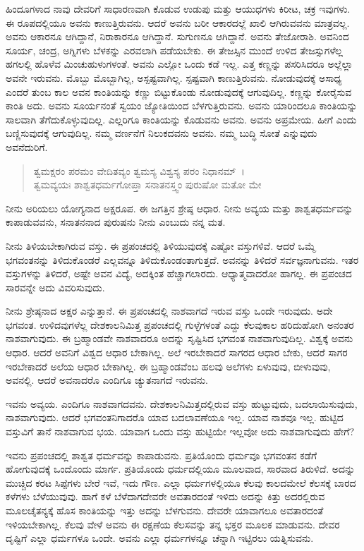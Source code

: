 ಹಿಂದೂಗಳಾದ ನಾವು ದೇವರಿಗೆ ಸಾಧಾರಣವಾಗಿ ಕೊಡುವ ಉಡುಪು ಮತ್ತು ಆಯುಧಗಳು ಕಿರೀಟ, ಚಕ್ರ ಇವುಗಳು. ಈ ರೂಪದಲ್ಲಿಯೂ ಅವನು ಕಾಣುತ್ತಿರುವನು. ಆದರೆ ಅವನು ಬರೀ ಆಕಾರದಲ್ಲೆ ಖಾಲಿ ಆಗಿರುವವನು ಮಾತ್ರವಲ್ಲ. ಅವನು ಆಕಾರನೂ ಆಗಿದ್ದಾನೆ, ನಿರಾಕಾರನೂ ಆಗಿದ್ದಾನೆ. ಸುಗುಣನೂ ಆಗಿದ್ದಾನೆ. ಅವನು ತೇಜೋರಾಶಿ. ಅವನಿಂದ ಸೂರ್ಯ, ಚಂದ್ರ, ಅಗ್ನಿಗಳು ಬೆಳಕನ್ನು ಎರವಲಾಗಿ ಪಡೆಯಬೇಕು. ಈ ತೇಜಸ್ಸಿನ ಮುಂದೆ ಉಳಿದ ತೇಜಸ್ಸುಗಳೆಲ್ಲ ಹಗಲಲ್ಲಿ ಹೊಳೆವ ಮಿಂಚುಹುಳುಗಳಂತೆ. ಅವನು ಎಲ್ಲೋ ಒಂದು ಕಡೆ ಇಲ್ಲ. ಎತ್ತ ಕಣ್ಣನ್ನು ಪಸರಿಸಿದರೂ ಅಲ್ಲೆಲ್ಲಾ ಅವನೇ ಇರುವನು. ಮೊಬ್ಬು ಮೊಬ್ಬಾಗಿಲ್ಲ, ಅಸ್ಪಷ್ಟವಾಗಿಲ್ಲ. ಸ್ಪಷ್ಟವಾಗಿ ಕಾಣುತ್ತಿರುವನು. ನೋಡುವುದಕ್ಕೆ ಅಸಾಧ್ಯ ಎಂದರೆ ತುಂಬ ಕಾಲ ಅವನ ಕಾಂತಿಯನ್ನು ಕಣ್ಣು ಬಿಟ್ಟುಕೊಂಡು ನೋಡುವುದಕ್ಕೆ ಆಗುವುದಿಲ್ಲ. ಕಣ್ಣನ್ನು ಕೋರೈಸುವ ಕಾಂತಿ ಅದು. ಅವನು ಸೂರ್ಯನಂತೆ ಸ್ವಯಂ ಜ್ಯೋತಿಯಿಂದ ಬೆಳಗುತ್ತಿರುವನು. ಅವನು ಯಾರಿಂದಲೂ ಕಾಂತಿಯನ್ನು ಸಾಲವಾಗಿ ತೆಗೆದುಕೊಳ್ಳುವುದಿಲ್ಲ. ಎಲ್ಲರಿಗೂ ಕಾಂತಿಯನ್ನು ಕೊಡುವನು ಅವನು. ಅವನು ಅಪ್ರಮೇಯ. ಹೀಗೆ ಎಂದು ಬಣ್ಣಿಸುವುದಕ್ಕೆ ಆಗುವುದಿಲ್ಲ. ನಮ್ಮ ವರ್ಣನೆಗೆ ನಿಲುಕದವನು ಅವನು. ನಮ್ಮ ಬುದ್ಧಿ ಸೋತೆ ಎನ್ನುವುದು ಅವನೆದುರಿಗೆ.

\begin{verse}
ತ್ವಮಕ್ಷರಂ ಪರಮಂ ವೇದಿತವ್ಯಂ ತ್ವಮಸ್ಯ ವಿಶ್ವಸ್ಯ ಪರಂ ನಿಧಾನಮ್~।\\ತ್ವಮವ್ಯಯಃ ಶಾಶ್ವತಧರ್ಮಗೋಪ್ತಾ ಸನಾತನಸ್ತ್ವಂ ಪುರುಷೋ ಮತೋ ಮೇ 
\end{verse}

{\small ನೀನು ಅರಿಯಲು ಯೋಗ್ಯನಾದ ಅಕ್ಷರೂಪ. ಈ ಜಗತ್ತಿನ ಶ್ರೇಷ್ಠ ಆಧಾರ. ನೀನು ಅವ್ಯಯ ಮತ್ತು ಶಾಶ್ವತಧರ್ಮವನ್ನು ಕಾಪಾಡುವವನು, ಸನಾತನನಾದ ಪುರುಷನು ನೀನು ಎಂಬುದು ನನ್ನ ಮತ.}

ನೀನು ತಿಳಿಯಬೇಕಾಗಿರುವ ವಸ್ತು. ಈ ಪ್ರಪಂಚದಲ್ಲಿ ತಿಳಿಯುವುದಕ್ಕೆ ಎಷ್ಟೋ ವಸ್ತುಗಳಿವೆ. ಆದರೆ ಒಮ್ಮೆ ಭಗವಂತನನ್ನು ತಿಳಿದುಕೊಂಡರೆ ಎಲ್ಲವನ್ನೂ ತಿಳಿದುಕೊಂಡಂತಾಗುತ್ತದೆ. ಅವನನ್ನು ತಿಳಿದರೆ ಸರ್ವಜ್ಞನಾಗುವನು. ಇತರ ವಸ್ತುಗಳನ್ನು ತಿಳಿದರೆ, ಅಷ್ಟೇ ಅವನ ವಿದ್ಯೆ, ಅದಕ್ಕಿಂತ ಹೆಚ್ಚಾಗಲಾರದು. ಆಧ್ಯಾತ್ಮವಾದರೋ ಹಾಗಲ್ಲ. ಈ ಪ್ರಪಂಚದ ಸಾರವನ್ನೇ ಅದು ವಿವರಿಸುವುದು.

ನೀನು ಶ್ರೇಷ್ಠನಾದ ಅಕ್ಷರ ಎನ್ನುತ್ತಾನೆ. ಈ ಪ್ರಪಂಚದಲ್ಲಿ ನಾಶವಾಗದೆ ಇರುವ ವಸ್ತು ಒಂದೇ ಇರುವುದು. ಅದೇ ಭಗವಂತ. ಉಳಿದವುಗಳೆಲ್ಲ ದೇಶಕಾಲನಿಮಿತ್ತ ಪ್ರಪಂಚದಲ್ಲಿ ಗುಳ್ಳೆಗಳಂತೆ ಎದ್ದು ಕೆಲವುಕಾಲ ಹರಿದುಹೋಗಿ ಅನಂತರ ನಾಶವಾಗುವುದು. ಈ ಬ್ರಹ್ಮಾಂಡವೇ ನಾಶವಾದರೂ ಅದನ್ನು ಸೃಷ್ಟಿಸಿದ ಭಗವಂತ ನಾಶವಾಗುವುದಿಲ್ಲ. ವಿಶ್ವಕ್ಕೆ ಅವನು ಆಧಾರ. ಆದರೆ ಅವನಿಗೆ ವಿಶ್ವದ ಆಧಾರ ಬೇಕಾಗಿಲ್ಲ. ಅಲೆ ಇರಬೇಕಾದರೆ ಸಾಗರದ ಆಧಾರ ಬೇಕು, ಆದರೆ ಸಾಗರ ಇರಬೇಕಾದರೆ ಅಲೆಯ ಆಧಾರ ಬೇಕಾಗಿಲ್ಲ. ಈ ಬ್ರಹ್ಮಾಂಡವೆಂಬ ಹಲವು ಅಲೆಗಳು ಏಳುವುವು, ಬೀಳುವುವು, ಅವನಲ್ಲಿ. ಆದರೆ ಅವನಾದರೊ ಎಂದಿಗೂ ಚ್ಯುತನಾಗದೆ ಇರುವನು. 

ಇವನು ಅವ್ಯಯ. ಎಂದಿಗೂ ನಾಶವಾಗದವನು. ದೇಶಕಾಲನಿಮಿತ್ತದಲ್ಲಿರುವ ವಸ್ತು ಹುಟ್ಟುವುದು, ಬದಲಾಯಿಸುವುದು, ನಾಶವಾಗುವುದು. ಆದರೆ ಭಗವಂತನಿಗಾದರೊ ಯಾವ ಬದಲಾವಣೆಯೂ ಇಲ್ಲ. ಯಾವ ನಾಶವೂ ಇಲ್ಲ. ಹುಟ್ಟಿದ ವಸ್ತುವಿಗೆ ತಾನೆ ನಾಶವಾಗುವ ಭಯ. ಯಾವಾಗ ಒಂದು ವಸ್ತು ಹುಟ್ಟಿಯೇ ಇಲ್ಲವೋ ಅದು ನಾಶವಾಗುವುದು ಹೇಗೆ?

ಇವನು ಪ್ರಪಂಚದಲ್ಲಿ ಶಾಶ್ವತ ಧರ್ಮವನ್ನು ಕಾಪಾಡುವನು. ಪ್ರತಿಯೊಂದು ಧರ್ಮವೂ ಭಗವಂತನ ಕಡೆಗೆ ಹೋಗುವುದಕ್ಕೆ ಒಂದೊಂದು ಮಾರ್ಗ. ಪ್ರತಿಯೊಂದು ಧರ್ಮದಲ್ಲಿಯೂ ಮೂಲವಾದ, ಸಾರವಾದ ತಿರುಳಿದೆ. ಅದನ್ನು ಮುಚ್ಚಿದ ಕರಟ ಸಿಪ್ಪೆಗಳು ಬೇರೆ ಇವೆ, ಇದು ಗೌಣ. ಎಲ್ಲಾ ಧರ್ಮಗಳಲ್ಲಿಯೂ ಕೆಲವು ಕಾಲದಮೇಲೆ ಕೆಲಸಕ್ಕೆ ಬಾರದ ಕಳೆಗಳು ಬೆಳೆಯುವುವು. ಹಾಗೆ ಕಳೆ ಬೆಳೆದಾಗದೇವರೇ ಅವತಾರದಂತೆ ಇಳಿದು ಅದನ್ನು ಕಿತ್ತು ಅದರಲ್ಲಿರುವ ಮೂಲಚೈತನ್ಯಕ್ಕೆ ಹೊಸ ಕಾಂತಿಯನ್ನು ಇತ್ತು ಅದನ್ನು ಬೆಳಗುವನು. ದೇವರೇ ಯಾವಾಗಲೂ ಅವತಾರದಂತೆ ಇಳಿಯಬೇಕಾಗಿಲ್ಲ. ಕೆಲವು ವೇಳೆ ಅವನು ಈ ರಕ್ಷಣೆಯ ಕೆಲಸವನ್ನು ತನ್ನ ಭಕ್ತರ ಮೂಲಕ ಮಾಡುವನು. ದೇವರ ದೃಷ್ಟಿಗೆ ಎಲ್ಲಾ ಧರ್ಮಗಳೂ ಒಂದೇ. ಅವನು ಎಲ್ಲಾ ಧರ್ಮಗಳನ್ನೂ ಚೆನ್ನಾಗಿ ಇಟ್ಟಿರಲು ಯತ್ನಿಸುವನು.


